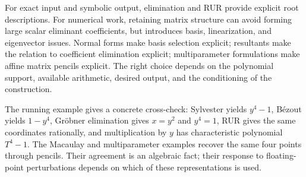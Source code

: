 \documentclass[12pt]{article}
\theoremstyle{definition}
\theoremstyle{remark}
\begin{document}
For exact input and symbolic output, elimination and RUR provide explicit root
descriptions. For numerical work, retaining matrix structure can avoid forming
large scalar eliminant coefficients, but introduces basis, linearization, and
eigenvector issues. Normal forms make basis selection explicit; resultants make
the relation to coefficient elimination explicit; multiparameter formulations make
affine matrix pencils explicit. The right choice depends on the polynomial support,
available arithmetic, desired output, and the conditioning of the construction.

The running example gives a concrete cross-check: Sylvester yields $y^4-1$,
B\'ezout yields $1-y^4$, Gr\"obner elimination gives $x=y^2$ and $y^4=1$, RUR
gives the same coordinates rationally, and multiplication by $y$ has characteristic
polynomial $T^4-1$. The Macaulay and multiparameter examples recover the same four
points through pencils. Their agreement is an algebraic fact; their response to
floating-point perturbations depends on which of these representations is used.

\clearpage


\end{document}
